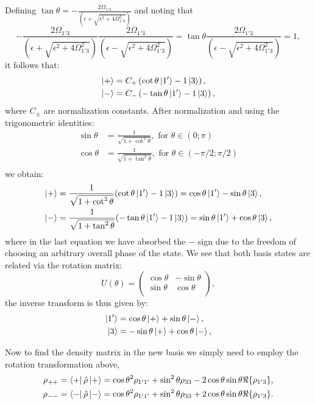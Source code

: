 \documentclass[10pt,letterpaper]{article}
\begin{document}
	Defining $\tan\theta = -\frac{2\Omega_{1'3}}{(\epsilon+\sqrt{\epsilon^2+4\Omega_{1'3}^2})}$ and noting that 
	$$
	-\frac{2\Omega_{1'3}}{(\epsilon+\sqrt{\epsilon^2+4\Omega_{1'3}^2})}\frac{2\Omega_{1'3}}{(\epsilon-\sqrt{\epsilon^2+4\Omega_{1'3}^2})} = \tan \theta \frac{2\Omega_{1'3}}{(\epsilon-\sqrt{\epsilon^2+4\Omega_{1'3}^2})} = 1,
	$$
	it follows that:
	\begin{align}
	\Ket{+} &= C_+\left( \cot\theta \Ket{1'} -1\Ket{3}\right), \\
	\Ket{-} &= C_-\left (-\tan\theta \Ket{1'} -1\Ket{3}\right),\\
	\end{align}
	where $C_\pm$ are normalization constants. After normalization and using the trigonometric identities: 
	\begin{align}
	\sin\theta &= \frac{1}{\sqrt{1+\cot^2\theta}} ,\text{ for } \theta \in (0;\pi) \\
	\cos\theta &= \frac{1}{\sqrt{1+\tan^2\theta}} ,\text{ for } \theta \in (-\pi/2;\pi/2) \\
	\end{align}
	we obtain:
	\begin{align}
	\Ket{+} &= \frac{1}{\sqrt{1+\cot^2\theta }} (\cot\theta \Ket{1'} -1\Ket{3}) = \cos\theta \Ket{1'} -\sin\theta\Ket{3} , \\
	\Ket{-} &= \frac{1}{\sqrt{1+\tan^2\theta }} (-\tan\theta \Ket{1'} -1\Ket{3}) = \sin\theta\Ket{1'} + \cos\theta\Ket{3}, 
	\end{align}
	where in the last equation we have absorbed the $-$ sign due to the freedom of choosing an arbitrary overall phase of the state. We see that both basis states are related via the rotation matrix: 
	$$
	U(\theta) = \begin{pmatrix} 
	\cos\theta & -\sin\theta \\
	\sin\theta & \cos\theta \\
	\end{pmatrix} , 
	$$
	the inverse transform is thus given by:
	\begin{align}
	\Ket{1'} &= \cos\theta \Ket{+} +\sin\theta\Ket{-} , \\
	\Ket{3} &=  -\sin\theta\Ket{+} + \cos\theta\Ket{-}, 
	\end{align}
	
	Now to find the density matrix in the new basis we simply need to employ the rotation transformation above, 
	\begin{align}
	\rho_{++} &= \Bra{+}{\hat{\rho}}\Ket{+} = \cos\theta^2\rho_{1'1'}+\sin^2\theta\rho_{33} - 2\cos\theta\sin\theta \Re\{\rho_{1'3}\}, \\
	\rho_{--} &= \Bra{-}{\hat{\rho}}\Ket{-} = \cos\theta^2\rho_{1'1'}+\sin^2\theta\rho_{33} + 2\cos\theta\sin\theta \Re\{\rho_{1'3}\}.
	\end{align}
	
\end{document}
